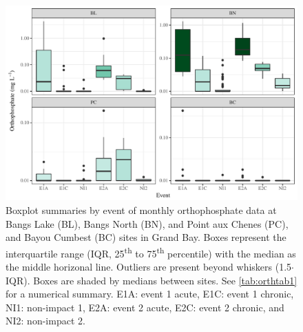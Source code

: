 \documentclass[letterpaper,12pt]{article}\usepackage[]{graphicx}\usepackage[]{color}
\makeatletter
\def\maxwidth{ %
  \ifdim\Gin@nat@width>\linewidth
    \linewidth
  \else
    \Gin@nat@width
  \fi
}
\makeatother
\begin{document}
\begin{figure}[!ht]

{\centering \includegraphics[width=\maxwidth]{figs/Fig5} 

}

\caption{Boxplot summaries by event of monthly orthophosphate data at Bangs Lake (BL), Bangs North (BN), and Point aux Chenes (PC), and Bayou Cumbest (BC) sites in Grand Bay.  Boxes represent the interquartile range (IQR, 25\textsuperscript{th} to 75\textsuperscript{th} percentile) with the median as the middle horizonal line.  Outliers are present beyond whiskers (1.5$\cdot$IQR). Boxes are shaded by medians between sites.  See \cref{tab:orthtab1} for a numerical summary. E1A: event 1 acute, E1C: event 1 chronic, NI1: non-impact 1, E2A: event 2 acute, E2C: event 2 chronic, and NI2: non-impact 2.}\label{fig:Fig5}
\end{figure}


\clearpage
\end{document}
